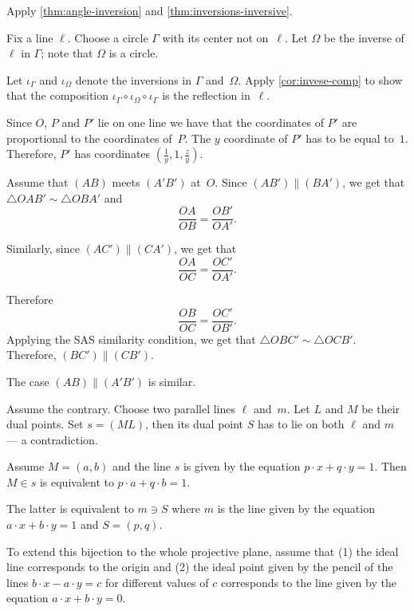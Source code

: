  Apply \ref{thm:angle-inversion} and \ref{thm:inversions-inversive}.
 
Fix a line $\ell$.
Choose a circle $\Gamma$ with its center not on~$\ell$.
Let $\Omega$ be the inverse of $\ell$ in $\Gamma$;
note that $\Omega$ is a circle.

Let $\iota_\Gamma$ and $\iota_\Omega$ denote the inversions in $\Gamma$ and~$\Omega$.
Apply \ref{cor:invese-comp} to show that the composition 
$\iota_\Gamma\circ\iota_\Omega\circ\iota_\Gamma$
is the reflection in~$\ell$.

\setcounter{eqtn}{0}

Since $O$, $P$ and $P'$ lie on one line we have that the coordinates of $P'$ are proportional to the coordinates of~$P$.
The $y$ coordinate of $P'$ has to be equal to~$1$.
Therefore, $P'$ has coordinates 
$(\tfrac1y,1,\tfrac zy)$.

Assume that $(AB)$ meets $(A'B')$ at~$O$.
Since $(AB')\parallel (BA')$, we get that $\triangle OAB'\sim\triangle OBA'$
and
\[\frac{OA}{OB}=\frac{OB'}{OA'}.\]

Similarly, since $(AC')\parallel (CA')$, we get that
\[\frac{OA}{OC}=\frac{OC'}{OA'}.\]

Therefore
\[\frac{OB}{OC}=\frac{OC'}{OB'}.\]
Applying the SAS similarity condition, we get that
$\triangle OBC'\sim\triangle OCB'$.
Therefore, $(BC')\parallel (CB')$.

The case $(AB)\parallel(A'B')$ is similar.

Assume the contrary.
Choose two parallel lines $\ell$ and~$m$.
Let $L$ and $M$ be their dual points.
Set $s=(ML)$, then its dual point $S$ has to lie on both $\ell$ and $m$ ---
a contradiction.

Assume $M=(a,b)$ 
and the line $s$ is given by the equation $p\cdot x+q\cdot y=1$.
Then $M\in s$ is equivalent to $p\cdot a+q\cdot b=1$.

The latter is equivalent to $m\ni S$
where $m$ is the line given by the equation 
$a\cdot x+b\cdot y=1$ and $S=(p,q)$.

To extend this bijection to the whole projective plane, assume that 
(1) the ideal line corresponds to the origin 
and (2) the ideal point given by the pencil of the lines $b\cdot x-a\cdot y=c$ for different values of $c$ corresponds to the line given by the equation $a\cdot x+b\cdot y=0$.

